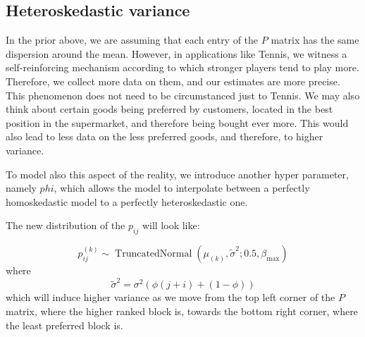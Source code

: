 \documentclass[11pt]{amsart}
\begin{document}
\clearpage

\subsection{Heteroskedastic variance}

In the prior above, we are assuming that each entry of the $P$ matrix has the same dispersion around the mean. However, in applications like Tennis, we witness a self-reinforcing mechanism according to which stronger players tend to play more. Therefore, we collect more data on them, and our estimates are more precise. This phenomenon does not need to be circumstanced just to Tennis. We may also think about certain goods being preferred by customers, located in the best position in the supermarket, and therefore being bought ever more. This would also lead to less data on the less preferred goods, and therefore, to higher variance.

To model also this aspect of the reality, we introduce another hyper parameter, namely $phi$, which allows the model to interpolate between a perfectly homoskedastic model to a perfectly heteroskedastic one. 

The new distribution of the $p_{ij}$ will look like: 


\begin{equation}
p_{ij}^{(k)} \sim \operatorname{TruncatedNormal}(\mu_{(k)}, \tilde{\sigma}^{2}; 0.5, \beta_{\max})
\end{equation}
where 
\[
\tilde{\sigma}^{2} = \sigma^2 \left( \phi (j+i) + (1-\phi) \right)
\]
which will induce higher variance as we move from the top left corner of the $P$ matrix, where the higher ranked block is, towards the bottom right corner, where the least preferred block is.
\end{document}
